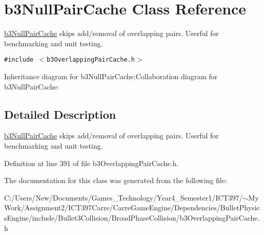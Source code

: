 \hypertarget{classb3_null_pair_cache}{
\section{b3NullPairCache Class Reference}
\label{classb3_null_pair_cache}
}
\hyperlink{classb3_null_pair_cache}{b3NullPairCache} skips add/removal of overlapping pairs. Userful for benchmarking and unit testing.  


{\tt \#include $<$b3OverlappingPairCache.h$>$}

Inheritance diagram for b3NullPairCache:Collaboration diagram for b3NullPairCache:

\subsection{Detailed Description}
\hyperlink{classb3_null_pair_cache}{b3NullPairCache} skips add/removal of overlapping pairs. Userful for benchmarking and unit testing. 

Definition at line 391 of file b3OverlappingPairCache.h.

The documentation for this class was generated from the following file:\begin{CompactItemize}
\item 
C:/Users/New/Documents/Games\_\-Technology/Year4\_\-Semester1/ICT397/$\sim$My Work/Assignment2/ICT397Carre/CarreGameEngine/Dependencies/BulletPhysicsEngine/include/Bullet3Collision/BroadPhaseCollision/b3OverlappingPairCache.h\end{CompactItemize}
